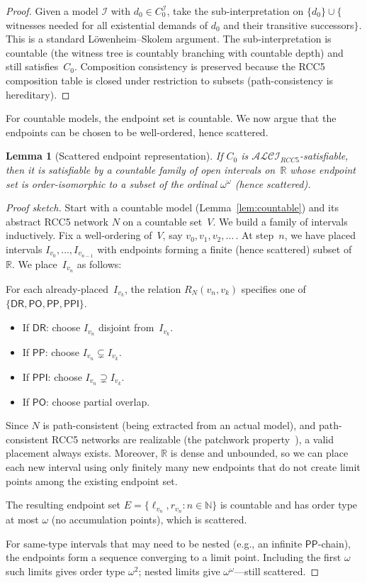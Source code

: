 \documentclass[a4paper,11pt]{article}
\newtheorem{lemma}[theorem]{Lemma}
\theoremstyle{definition}
\newcommand{\ALCIRCC}[1]{\ensuremath{\mathcal{ALCI}_{\mathit{RCC#1}}}}
\newcommand{\interp}{\ensuremath{\mathcal{I}}}
\newcommand{\DR}{\ensuremath{\mathsf{DR}}}
\newcommand{\PO}{\ensuremath{\mathsf{PO}}}
\newcommand{\PP}{\ensuremath{\mathsf{PP}}}
\newcommand{\PPI}{\ensuremath{\mathsf{PPI}}}
\newcommand{\reals}{\ensuremath{\mathbb{R}}}
\newcommand{\nats}{\ensuremath{\mathbb{N}}}
\begin{document}
\begin{proof}
Given a model $\interp$ with $d_0 \in C_0^{\interp}$, take the
sub-interpretation on $\{d_0\} \cup \{$witnesses needed for all
existential demands of $d_0$ and their transitive successors$\}$.
This is a standard L\"owenheim--Skolem argument.  The sub-interpretation
is countable (the witness tree is countably branching with countable
depth) and still satisfies~$C_0$.  Composition consistency is
preserved because the RCC5 composition table is closed under restriction
to subsets (path-consistency is hereditary).
\end{proof}

For countable models, the endpoint set is countable.  We now argue that
the endpoints can be chosen to be well-ordered, hence scattered.

\begin{lemma}[Scattered endpoint representation]
\label{lem:scattered}
If $C_0$ is $\ALCIRCC{5}$-satisfiable, then it is satisfiable by a
countable family of open intervals on~$\reals$ whose endpoint set is
order-isomorphic to a subset of the ordinal $\omega^\omega$
\textup{(}hence scattered\textup{)}.
\end{lemma}

\begin{proof}[Proof sketch]
Start with a countable model (Lemma~\ref{lem:countable}) and its
abstract RCC5 network $N$ on a countable set~$V$.  We build a family
of intervals inductively.  Fix a well-ordering of~$V$, say
$v_0, v_1, v_2, \ldots$\,.  At step~$n$, we have placed intervals
$I_{v_0}, \ldots, I_{v_{n-1}}$ with endpoints forming a finite
(hence scattered) subset of~$\reals$.  We place~$I_{v_n}$ as
follows:

For each already-placed~$I_{v_k}$, the relation $R_N(v_n, v_k)$
specifies one of $\{\DR, \PO, \PP, \PPI\}$.
\begin{itemize}[nosep]
  \item If $\DR$: choose $I_{v_n}$ disjoint from~$I_{v_k}$.
  \item If $\PP$: choose $I_{v_n} \subsetneq I_{v_k}$.
  \item If $\PPI$: choose $I_{v_n} \supsetneq I_{v_k}$.
  \item If $\PO$: choose partial overlap.
\end{itemize}
Since $N$ is path-consistent (being extracted from an actual model),
and path-consistent RCC5 networks are realizable
(the patchwork property~\cite{RenzNebel1999}), a valid placement always exists.
Moreover, $\reals$ is dense and unbounded, so we can place each new
interval using only finitely many new endpoints that do not create
limit points among the existing endpoint set.

The resulting endpoint set $E = \{\ell_{v_n}, r_{v_n} : n \in \nats\}$
is countable and has order type at most $\omega$ (no accumulation
points), which is scattered.

For same-type intervals that may need to be nested (e.g., an infinite
$\PP$-chain), the endpoints form a sequence converging to a limit
point.  Including the first $\omega$ such limits gives order type
$\omega^2$; nested limits give $\omega^\omega$---still scattered.
\end{proof}
\end{document}
